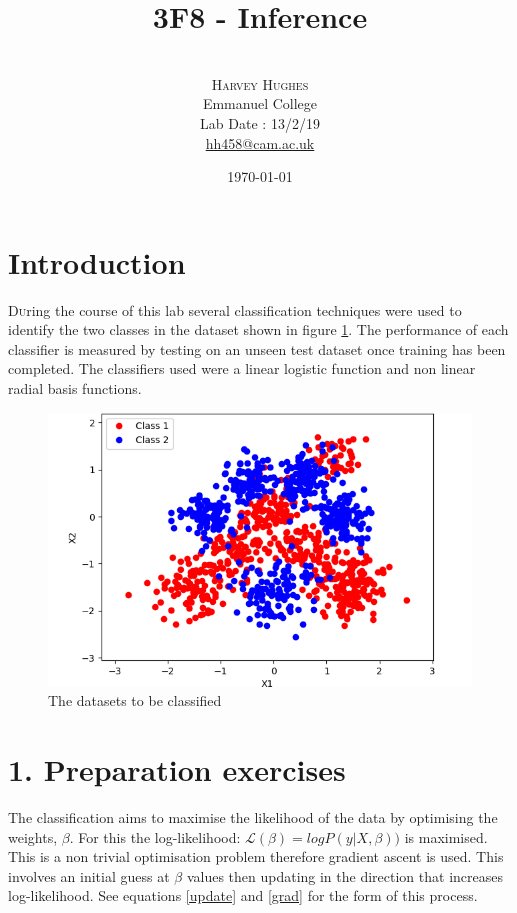 \documentclass[twoside,twocolumn]{article}
\title{3F8 - Inference } %
\author{%
\\
\textsc{Harvey Hughes} \\
\normalsize Emmanuel College \\ %
\normalsize Lab Date : 13/2/19 \\
\normalsize \href{mailto:hh458@cam.ac.uk}{hh458@cam.ac.uk} %
}
\date{\today} %
\begin{document}
\maketitle


\section{Introduction}

\lettrine[nindent=0em,lines=3]{D}uring the course of this lab several classification techniques were used to identify the two classes in the dataset shown in figure \ref{fig:1}. The performance of each classifier is measured by testing on an unseen test dataset once training has been completed. The classifiers used were a linear logistic function and non linear radial basis functions.

\begin{figure}[h]
  \centering
    \includegraphics[width=\linewidth]{1-Data}
  \caption{The datasets to be classified}
  \label{fig:1}
\end{figure}
\section{1. Preparation exercises}
The classification aims to maximise the likelihood of the data by optimising the weights, $\beta$. For this the log-likelihood: $\mathcal{L}(\beta )=logP(y|X,\beta ))$ is maximised. This is a non trivial optimisation problem therefore gradient ascent is used. This involves an initial guess at $\beta$ values then updating in the direction that increases log-likelihood. See equations \ref{update} and \ref{grad} for the form of this process. 
\end{document}
